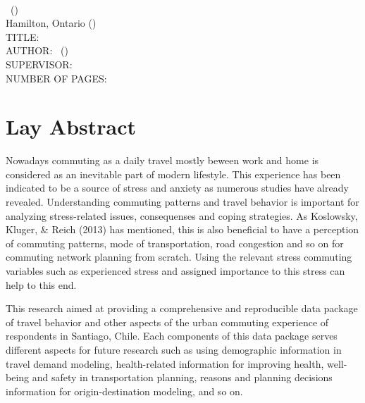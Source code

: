 \documentclass[
11pt, %
oneside, %
english, %
singlespacing, %
]{macthesis} %
\begin{document}
{
\newpage
{} %
\setcounter{page}{2} %
\hypersetup{linkcolor=black}
\noindent %
\univname \\
\degreename\, (\the\year) \\
Hamilton, Ontario (\deptname) \\[1.5cm]
TITLE: \ttitle \\
AUTHOR: \authorname\,  %
(\univname)  \\
SUPERVISOR: \supname\, \\
NUMBER OF PAGES: \pageref{LastPage}  %

\clearpage
}
\section*{Lay Abstract}
  Nowadays commuting as a daily travel mostly beween work and home is considered as an inevitable part of modern lifestyle. This experience has been indicated to be a source of stress and anxiety as numerous studies have already revealed. Understanding commuting patterns and travel behavior is important for analyzing stress-related issues, consequenses and coping strategies. As Koslowsky, Kluger, \& Reich (2013) has mentioned, this is also beneficial to have a perception of commuting patterns, mode of transportation, road congestion and so on for commuting network planning from scratch. Using the relevant stress commuting variables such as experienced stress and assigned importance to this stress can help to this end.

  This research aimed at providing a comprehensive and reproducible data package of travel behavior and other aspects of the urban commuting experience of respondents in Santiago, Chile. Each components of this data package serves different aspects for future research such as using demographic information in travel demand modeling, health-related information for improving health, well-being and safety in transportation planning, reasons and planning decisions information for origin-destination modeling, and so on.
\end{document}

